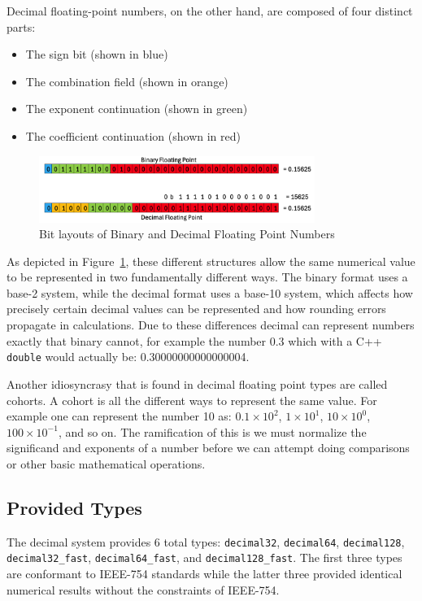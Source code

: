 \documentclass[acmsmall]{acmart}
\newcommand{\code}[1]{\texttt{#1}}
\begin{document}
Decimal floating-point numbers, on the other hand, are composed of four distinct parts:
\begin{itemize}
    \item The sign bit (shown in blue)
    \item The combination field (shown in orange)
    \item The exponent continuation (shown in green)
    \item The coefficient continuation (shown in red)
\end{itemize}

\begin{figure}[H]
    \centering
    \includegraphics[width=0.8\textwidth]{layout.png}
    \caption{Bit layouts of Binary and Decimal Floating Point Numbers}
    \label{fig:fp-layouts}
\end{figure}

As depicted in Figure~\ref{fig:fp-layouts}, these different structures allow the same numerical value to be represented in two fundamentally different ways. 
The binary format uses a base-2 system, while the decimal format uses a base-10 system, which affects how precisely certain decimal values can be represented and how rounding errors propagate in calculations.
Due to these differences decimal can represent numbers exactly that binary cannot, for example the number 0.3 which with a C++ \code{double} would actually be: 0.30000000000000004.

Another idiosyncrasy that is found in decimal floating point types are called cohorts\cite{ieee754-2019}.
A cohort is all the different ways to represent the same value.
For example one can represent the number 10 as: $0.1\times10^2$, $1\times10^1$, $10\times10^0$, $100\times10^{-1}$, and so on.
The ramification of this is we must normalize the significand and exponents of a number before we can attempt doing comparisons or other basic mathematical operations.

\subsection{Provided Types}

The decimal system provides 6 total types: \code{decimal32}, \code{decimal64}, \code{decimal128}, \code{decimal32\_fast}, \code{decimal64\_fast}, and \code{decimal128\_fast}.
The first three types are conformant to IEEE-754 standards while the latter three provided identical numerical results without the constraints of IEEE-754.
\end{document}
